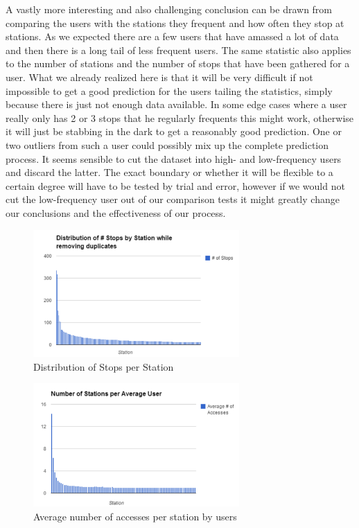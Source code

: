 A vastly more interesting and also challenging conclusion can be drawn from comparing the users with the stations they frequent and how often they stop at stations. As we expected there are a few users that have amassed a lot of data and then there is a long tail of less frequent users. The same statistic also applies to the number of stations and the number of stops that have been gathered for a user. What we already realized here is that it will be very difficult if not impossible to get a good prediction for the users tailing the statistics, simply because there is just not enough data available. In some edge cases where a user really only has 2 or 3 stops that he regularly frequents this might work, otherwise it will just be stabbing in the dark to get a reasonably good prediction. One or two outliers from such a user could possibly mix up the complete prediction process. It seems sensible to cut the dataset into high- and low-frequency users and discard the latter. The exact boundary or whether it will be flexible to a certain degree will have to be tested by trial and error, however if we would not cut the low-frequency user out of our comparison tests it might greatly change our conclusions and the effectiveness of our process.

\begin{figure}[H]
	\centering
	\includegraphics[width=0.7\textwidth]{charts/distribution_stops_by_station}
	\caption{Distribution of Stops per Station}	
\end{figure}

\begin{figure}[H]
	\centering
	\includegraphics[width=0.7\textwidth]{charts/number_stations_average_user}
	\caption{Average number of accesses per station by users}	
\end{figure}

